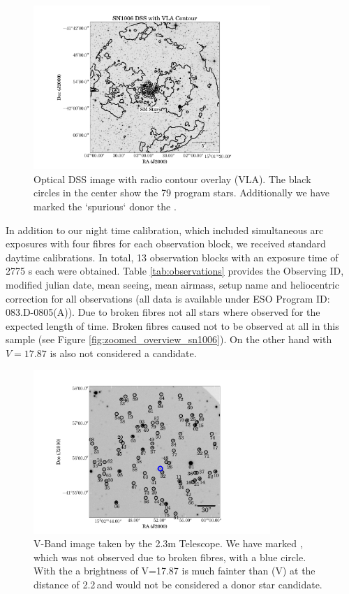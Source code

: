 \begin{figure}[htbp] %
   \centering
   \includegraphics[width=0.8\textwidth]{chapter_sn1006/plots/sn1006_overlay_withsm.pdf} 
   \caption{Optical DSS image with radio contour overlay (VLA). The black circles in the center show the 79 program stars. Additionally we have marked the `spurious` donor the \smstar.}
   \label{fig:overview_sn1006}
\end{figure}
In addition to our night time calibration, which included simultaneous arc exposures with four fibres for each observation block, we received standard daytime calibrations. In total, 13 observation blocks with an exposure time of 2775 s each were obtained. Table \ref{tab:observations} provides the Observing ID, modified julian date, mean seeing, mean airmass, setup name and heliocentric correction for all observations (all data is available under ESO Program ID: 083.D-0805(A)). Due to broken fibres not all stars where observed for the expected length of time. Broken fibres caused  not to be observed at all in this sample (see Figure \ref{fig:zoomed_overview_sn1006}). On the other hand  with $V=17.87$ is also not considered a candidate.


\begin{figure}[htbp] %
   \centering
   \includegraphics[width=0.8\textwidth]{chapter_sn1006/plots/overview_labeled_sn1006.pdf} 
   \caption{V-Band image taken by the 2.3m Telescope. We have marked , which was not observed due to broken fibres, with a blue circle. With the a brightness of V=17.87  is much fainter than \lsun(V) at the distance of 2.2\,\kpc and would not be considered a donor star candidate.}
   \label{fig:overview_sn1006}
\end{figure}


